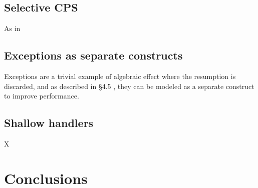 \documentclass{article}
\theoremstyle{definition}
\theoremstyle{lemma}
\theoremstyle{observation}
\theoremstyle{theorem}
\begin{document}
    \subsection{Selective CPS}

    As in \cite{leijen-koka}

    \subsection{Exceptions as separate constructs}

    Exceptions are a trivial example of algebraic effect where the resumption is
    discarded, and as described in \S 4.5 \cite{handlers-cps}, they can be modeled
    as a separate construct to improve performance.

    \subsection{Shallow handlers}

    X \cite{shallow-handlers}

\section{Conclusions}

\printbibliography
\end{document}
